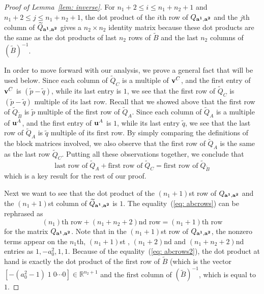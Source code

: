 \documentclass[11pt]{amsart}
\theoremstyle{plain}
\theoremstyle{definition}
\theoremstyle{remark}
\numberwithin{theorem}{section}
\begin{document}
\begin{proof} [Proof of Lemma~\ref{lem: inverse}]
For $n_1+2 \leq i \leq n_1+n_2+1$ and $n_1+2 \leq j \leq n_1+n_2+1$,  the dot product of the $i$th row of $Q_{{\bf a^1}, {\bf a^2}}$  and the $j$th  column of $\widetilde{Q}_{{\bf a^1}, {\bf a^2}}$ gives a $n_2 \times n_2$ identity matrix because these dot products are the same as the dot products of last $n_2$  rows of $\widetilde{B}$ and the last $n_2$ columns of  $(\widetilde{B})^{-1}$. 

In order to move forward with our analysis, we prove a general fact that will be used below. Since each column of $\widetilde{Q}_C$ is a multiple of ${\bf v}^C$, and the first entry of ${\bf v}^C$ is $(\widetilde{p}-\widetilde{q})$, while its last entry is $1$, we see that the first row of $\widetilde{Q}_C$ is $(\widetilde{p}-\widetilde{q})$ multiple of its last row. Recall that we showed above that the first  row of  $\widetilde{Q}_{\widetilde{B}}$ is $\widetilde{p}$ multiple of the first row of $\widetilde{Q}_A$. Since each column of $\widetilde{Q}_A$ is a multiple of ${\bf u}^A$, and the first entry of ${\bf u}^A$ is $1$, while its last entry $\widetilde{q}$, we see that the last row of $\widetilde{Q}_A$ is $\widetilde{q}$ multiple of its first row. By simply comparing the definitions of the block matrices involved, we also observe that the first row of $\widetilde{Q}_A$ is the same as the last row $\widetilde{Q}_C$. Putting all these observations together, we conclude that 
\begin{equation}\label{eq: abcrows}
 \mbox{last row of}\;  \widetilde{Q}_A +  \mbox{first row of}\;  \widetilde{Q}_C = \mbox{first row of}\;  \widetilde{Q}_{\widetilde{B}} 
\end{equation}
which is a key result for the rest of our proof. 

Next we want to see that the dot product of the $(n_1+1)$st row of $Q_{{\bf a^1}, {\bf a^2}}$ and the  $(n_1+1)$st  column of $\widetilde{Q}_{{\bf a^1}, {\bf a^2}}$ is $1$. The equality~(\ref{eq: abcrows}) can be rephrased as 
\begin{equation}\label{eq: abcrows2}
(n_1)\mbox{th row} + (n_1+n_2+2)\mbox{nd row} = (n_1+1)\mbox{th row} 
\end{equation}
for the matrix $Q_{{\bf a^1}, {\bf a^2}}$. Note that  in the  $(n_1+1)$st  row of $Q_{{\bf a^1}, {\bf a^2}}$, the nonzero terms appear on the $n_1$th,  $(n_1+1)$st , $(n_1+2)$nd and $(n_1+n_2+2)$nd entries as $1,-a_0^2,1,1$. Because of the equality~(\ref{eq: abcrows2}),   the dot product at hand is exactly the dot product of the first row of $\widetilde{B}$ (which is the vector $[-(a_0^2-1) \; 1 \; 0 \cdots 0] \in \mathbb{R}^{n_2+1}$ and the first column of $(\widetilde{B})^{-1}$, which is equal to $1$. 


\end{proof}
\end{document}
